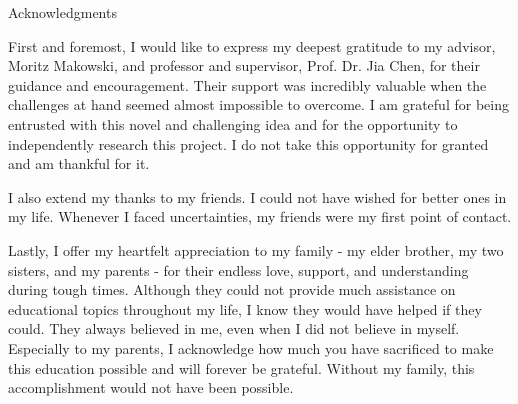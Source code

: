 \thispagestyle{empty}

\vspace*{20mm}

\begin{center}
    { Acknowledgments}
\end{center}

First and foremost, I would like to express my deepest gratitude to my advisor, Moritz Makowski, and professor and supervisor, Prof. Dr. Jia Chen, for their guidance and encouragement.
Their support was incredibly valuable when the challenges at hand seemed almost impossible to overcome.
I am grateful for being entrusted with this novel and challenging idea and for the opportunity to independently research this project.
I do not take this opportunity for granted and am thankful for it.

I also extend my thanks to my friends.
I could not have wished for better ones in my life.
Whenever I faced uncertainties, my friends were my first point of contact.

Lastly, I offer my heartfelt appreciation to my family - my elder brother, my two sisters, and my parents - for their endless love, support, and understanding during tough times.
Although they could not provide much assistance on educational topics throughout my life, I know they would have helped if they could.
They always believed in me, even when I did not believe in myself.
Especially to my parents, I acknowledge how much you have sacrificed to make this education possible and will forever be grateful.
Without my family, this accomplishment would not have been possible.

\vspace{10mm}

\cleardoublepage{}
